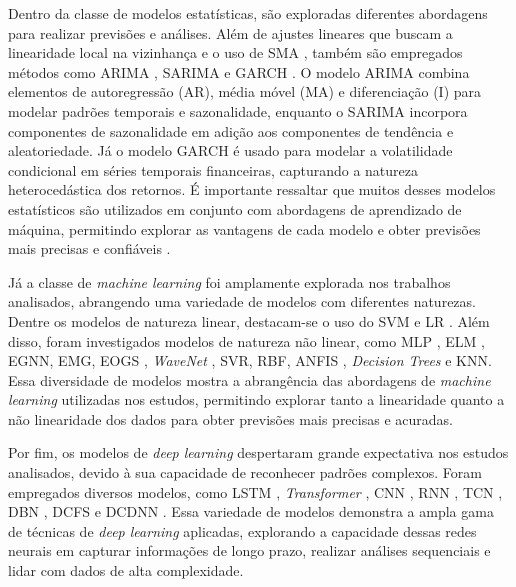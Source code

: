 Dentro da classe de modelos estatísticas, são exploradas diferentes abordagens para realizar previsões e análises. Além de ajustes lineares que buscam a linearidade local na vizinhança \cite{Charlene} e o uso de \ac{SMA} \cite{Ciniro_Econometric}, também são empregados métodos como \ac{ARIMA} \cite{Leonardo_Comparative, gao2021stock}, \ac{SARIMA} e \ac{GARCH} \cite{Ciniro_Econometric}. O modelo \ac{ARIMA} combina elementos de autoregressão (AR), média móvel (MA) e diferenciação (I) para modelar padrões temporais e sazonalidade, enquanto o \ac{SARIMA} incorpora componentes de sazonalidade em adição aos componentes de tendência e aleatoriedade. Já o modelo \ac{GARCH} é usado para modelar a volatilidade condicional em séries temporais financeiras, capturando a natureza heterocedástica dos retornos. É importante ressaltar que muitos desses modelos estatísticos são utilizados em conjunto com abordagens de aprendizado de máquina, permitindo explorar as vantagens de cada modelo e obter previsões mais precisas e confiáveis \cite{Ciniro_Econometric}.

Já a classe de \textit{machine learning} foi amplamente explorada nos trabalhos analisados, abrangendo uma variedade de modelos com diferentes naturezas. Dentre os modelos de natureza linear, destacam-se o uso do \ac{SVM} \cite{altan2019effect, Anand_Comparison} e \ac{LR} \cite{pabucccu2023forecasting}. Além disso, foram investigados modelos de natureza não linear, como \ac{MLP} \cite{Jerzy_Deep, Faramarz_Integrating}, \ac{ELM} \cite{Manrui_two-stage}, \ac{EGNN}, \ac{EMG}, \ac{EOGS} \cite{Vinicius_Sistemas}, \textit{WaveNet} \cite{Leonardo_Comparative}, \ac{SVR}, \ac{RBF}, ANFIS \cite{Faramarz_Integrating}, \textit{Decision Trees} e \ac{KNN}\cite{halil2019predicting}. Essa diversidade de modelos mostra a abrangência das abordagens de \textit{machine learning} utilizadas nos estudos, permitindo explorar tanto a linearidade quanto a não linearidade dos dados para obter previsões mais precisas e acuradas.

Por fim, os modelos de \textit{deep learning} despertaram grande expectativa nos estudos analisados, devido à sua capacidade de reconhecer padrões complexos. Foram empregados diversos modelos, como \ac{LSTM} \cite{anwar2019forecasting, Xiaoci_Predicting, Jian_Forecasting, gao2021stock,  lee2021exploring, Firat}, \textit{Transformer} \cite{Chaojie_Stock}, \ac{CNN} \cite{Anand_Comparison}, \ac{RNN} \cite{Xiaoci_Predicting, gao2021stock, Anand_Comparison, Firat}, \ac{TCN} \cite{Firat}, \ac{DBN} \cite{Xiaoci_Predicting}, \ac{DCFS} \cite{Li-Xin_Fast} e \ac{DCDNN} \cite{Jian_Forecasting}. Essa variedade de modelos demonstra a ampla gama de técnicas de \textit{deep learning} aplicadas, explorando a capacidade dessas redes neurais em capturar informações de longo prazo, realizar análises sequenciais e lidar com dados de alta complexidade. 

